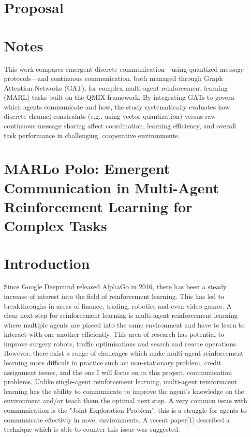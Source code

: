 \documentclass[20pt]{article}
\begin{document}
\section*{\fontsize{30}{36}\selectfont Proposal}

\section*{Notes}
This work compares emergent discrete communication—using quantized message protocols—and continuous communication, both managed through Graph Attention Networks (GAT), for complex multi-agent reinforcement learning (MARL) tasks built on the QMIX framework. By integrating GATs to govern which agents communicate and how, the study systematically evaluates how discrete channel constraints (e.g., using vector quantization) versus raw continuous message sharing affect coordination, learning efficiency, and overall task performance in challenging, cooperative environments.

\section*{\fontsize{15}{5}\selectfont MARLo Polo: Emergent Communication in Multi-Agent Reinforcement Learning for Complex Tasks}

\section{Introduction}


Since Google Deepmind released AlphaGo in 2016, there has been a steady increase of interest into the field of reinforcement learning. This has led to breakthroughs in areas of finance, trading, robotics and even video games. A clear next step for reinforcement learning is multi-agent reinforcement learning where multiple agents are placed into the same environment and have to learn to interact with one another efficiently. This area of research has potential to improve surgery robots, traffic optimisations and search and rescue operations. However, there exist a range of challenges which make multi-agent reinforcement learning more difficult in practice such as: non-stationary problem, credit assignment issues, and the one I will focus on in this project, communication problems. Unlike single-agent reinforcement learning, multi-agent reinformcent learning has the ability to communicate to improve the agent's knowledge on the environment and/or teach them the optimal next step. A very common issue with communication is the "Joint Exploration Problem", this is a struggle for agents to communicate effectivly in novel environments. A recent paper[1] described a technique which is able to counter this issue was suggested.
\end{document}
